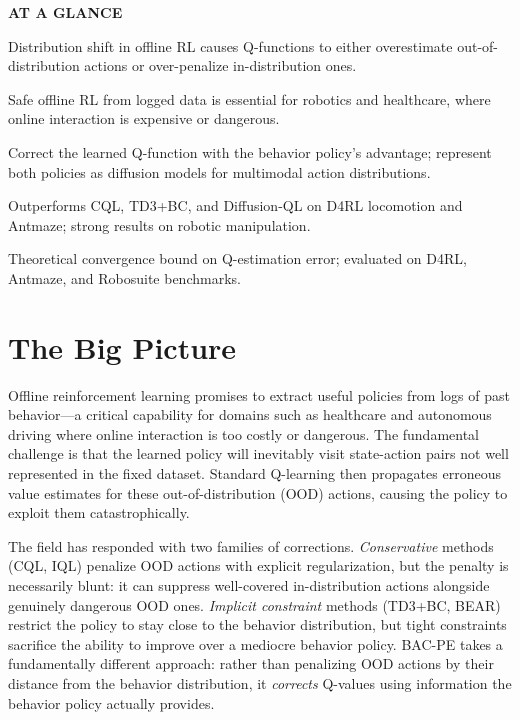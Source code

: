 \documentclass[10pt,twocolumn]{article}
\begin{document}
\begin{mdframed}[backgroundcolor=boxgray,linecolor=rulered,linewidth=1pt,
    innerleftmargin=6pt,innerrightmargin=6pt,
    innertopmargin=6pt,innerbottommargin=6pt]
\textbf{\small AT A GLANCE}\par\vspace{4pt}
\begin{description}[leftmargin=0pt,labelsep=4pt,itemsep=2pt,parsep=0pt,
    font=\small\bfseries]
  \item[Problem:] Distribution shift in offline RL causes Q-functions to either
    overestimate out-of-distribution actions or over-penalize in-distribution ones.
  \item[Why it matters:] Safe offline RL from logged data is essential for robotics
    and healthcare, where online interaction is expensive or dangerous.
  \item[Method:] Correct the learned Q-function with the behavior policy's advantage;
    represent both policies as diffusion models for multimodal action distributions.
  \item[Result:] Outperforms CQL, TD3+BC, and Diffusion-QL on D4RL locomotion and
    Antmaze; strong results on robotic manipulation.
  \item[Evidence:] Theoretical convergence bound on Q-estimation error; evaluated on
    D4RL, Antmaze, and Robosuite benchmarks.
\end{description}
\end{mdframed}

\section{The Big Picture}

Offline reinforcement learning promises to extract useful policies from logs of past
behavior---a critical capability for domains such as healthcare and autonomous driving
where online interaction is too costly or dangerous. The fundamental challenge is that
the learned policy will inevitably visit state-action pairs not well represented in
the fixed dataset. Standard Q-learning then propagates erroneous value estimates for
these out-of-distribution (OOD) actions, causing the policy to exploit them
catastrophically.

The field has responded with two families of corrections. \emph{Conservative} methods
(CQL, IQL) penalize OOD actions with explicit regularization, but the penalty is
necessarily blunt: it can suppress well-covered in-distribution actions alongside
genuinely dangerous OOD ones. \emph{Implicit constraint} methods (TD3+BC, BEAR)
restrict the policy to stay close to the behavior distribution, but tight constraints
sacrifice the ability to improve over a mediocre behavior policy. BAC-PE takes a
fundamentally different approach: rather than penalizing OOD actions by their
distance from the behavior distribution, it \emph{corrects} Q-values using
information the behavior policy actually provides.
\end{document}
